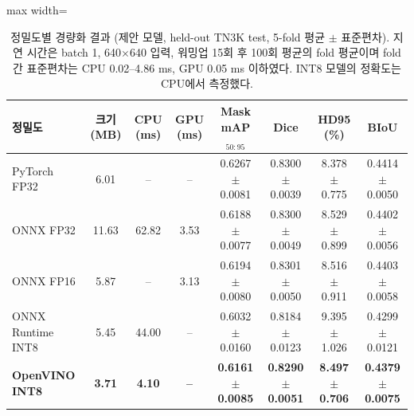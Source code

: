 \begin{table}[htbp]
\centering
\footnotesize
\caption[정밀도별 경량화 결과 (제안 모델, held-out TN3K test, 5-fold 평균 $\pm$ 표준편차).]{정밀도별 경량화 결과 (제안 모델, held-out TN3K test, 5-fold 평균 $\pm$ 표준편차). 지연 시간은 batch 1, 640$\times$640 입력, 워밍업 15회 후 100회 평균의 fold 평균이며 fold 간 표준편차는 CPU 0.02--4.86 ms, GPU 0.05 ms 이하였다. INT8 모델의 정확도는 CPU에서 측정했다.}
\label{tab:quant}
\setlength{\tabcolsep}{3.5pt}
\begin{adjustbox}{max width=\linewidth}
\begin{tabular}{lccccccc}
\toprule
정밀도 & 크기 (MB) & CPU (ms) & GPU (ms) & Mask mAP$_{50:95}$ & Dice & HD95 (\%) & BIoU \\
\midrule
PyTorch FP32 & 6.01 & -- & -- & 0.6267 $\pm$ 0.0081 & 0.8300 $\pm$ 0.0039 & 8.378 $\pm$ 0.775 & 0.4414 $\pm$ 0.0050 \\
ONNX FP32 & 11.63 & 62.82 & 3.53 & 0.6188 $\pm$ 0.0077 & 0.8300 $\pm$ 0.0049 & 8.529 $\pm$ 0.899 & 0.4402 $\pm$ 0.0056 \\
ONNX FP16 & 5.87 & -- & 3.13 & 0.6194 $\pm$ 0.0080 & 0.8301 $\pm$ 0.0050 & 8.516 $\pm$ 0.911 & 0.4403 $\pm$ 0.0058 \\
ONNX Runtime INT8 & 5.45 & 44.00 & -- & 0.6032 $\pm$ 0.0160 & 0.8184 $\pm$ 0.0123 & 9.395 $\pm$ 1.026 & 0.4299 $\pm$ 0.0121 \\
\textbf{OpenVINO INT8} & \textbf{3.71} & \textbf{4.10} & \textbf{--} & \textbf{0.6161 $\pm$ 0.0085} & \textbf{0.8290 $\pm$ 0.0051} & \textbf{8.497 $\pm$ 0.706} & \textbf{0.4379 $\pm$ 0.0075} \\
\bottomrule
\end{tabular}
\end{adjustbox}
\end{table}
